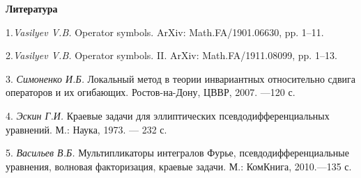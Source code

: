 \smallskip \centerline {\bf Литература} \nopagebreak

1.{\it Vasilyev V.B.} Operator symbols.  ArXiv: Math.FA/1901.06630, pp. 1--11.

2.{\it  Vasilyev V.B.} Operator symbols. II. ArXiv: Math.FA/1911.08099, pp. 1--13.

3. {\it Симоненко И.Б.} Локальный метод в теории инвариантных относительно сдвига операторов и их огибающих. Ростов-на-Дону, ЦВВР, 2007. ---120 с.

4. {\it Эскин Г.И.} Краевые задачи для эллиптических псевдодифференциальных уравнений. М.: Наука, 1973. — 232 с.

5. {\it Васильев В.Б.} Мультипликаторы интегралов Фурье, псевдодифференциальные уравнения, волновая факторизация, краевые задачи. М.: КомКнига, 2010.---135 с.
